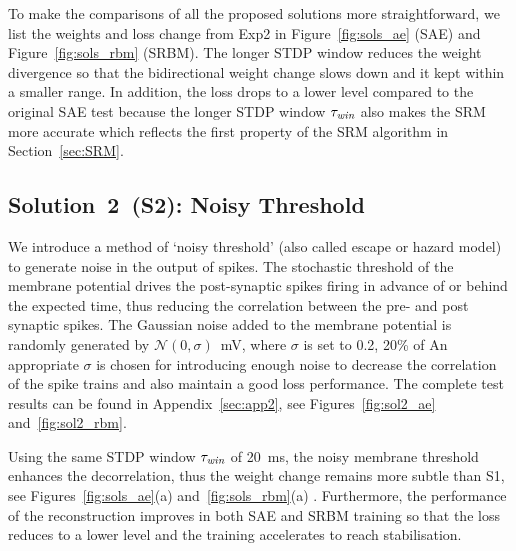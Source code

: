 To make the comparisons of all the proposed solutions more straightforward, we list the weights and loss change from Exp2 in Figure~\ref{fig:sols_ae} (SAE) and Figure~\ref{fig:sols_rbm} (SRBM).
The longer STDP window reduces the weight divergence so that the bidirectional weight change slows down and it kept within a smaller range.
In addition, the loss drops to a lower level compared to the original SAE test because the longer STDP window $\tau_{\textit{\textrm{win}}}$ also makes the SRM more accurate which reflects the first property of the SRM algorithm in Section~\ref{sec:SRM}.



\subsection{Solution~2~(S2): Noisy Threshold}
We introduce a method of `noisy threshold' (also called escape or hazard model)~\citep{gerstner2002spiking} to generate noise in the output of spikes.
The stochastic threshold of the membrane potential drives the post-synaptic spikes firing in advance of or behind the expected time, thus reducing the correlation between the pre- and post synaptic spikes.
The Gaussian noise added to the membrane potential is randomly generated by $\mathcal{N}(0, \sigma)$~mV, where $\sigma$ is set to 0.2, 20\% of \DIFdelbegin {}\DIFdelend \DIFaddbegin {}\DIFaddend An appropriate $\sigma$ is chosen for introducing enough noise to decrease the correlation of the spike trains and also maintain a good loss performance.
The complete test results can be found in Appendix~\ref{sec:app2}, see Figures~\ref{fig:sol2_ae} and~\ref{fig:sol2_rbm}.

Using the same STDP window $\tau_{\textit{\textrm{win}}}$ of 20~ms, the noisy membrane threshold enhances the decorrelation, thus the weight change remains more subtle than S1, see Figures~\ref{fig:sols_ae}(a) and~\ref{fig:sols_rbm}(a) .
Furthermore, the performance of the reconstruction improves in both SAE and SRBM training so that the loss reduces to a lower level and the training accelerates to reach stabilisation. %


